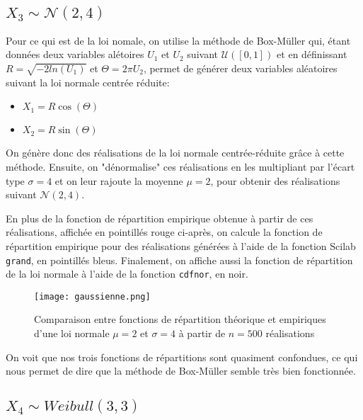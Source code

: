 \documentclass{article}
\begin{document}
\begin{multicols}{2}
\subsection{$X_3 \sim \mathcal{N}(2, 4)$}\label{subsec:ex23}

Pour ce qui est de la loi nomale, on utilise la méthode de Box-Müller qui, étant
données deux variables alétoires $U_1$ et $U_2$ suivant $\mathcal{U}([0, 1])$ et
en définissant $R = \sqrt{-2 ln(U_1)}$ et $\Theta = 2 \pi U_2$, permet de
générer deux variables aléatoires suivant la loi normale centrée réduite:

\begin{itemize}
    \item $X_1 = R\cos(\Theta)$
    \item $X_2 = R\sin(\Theta)$
\end{itemize}

On génère donc des réalisations de la loi normale centrée-réduite grâce à cette
méthode. Ensuite, on "dénormalise" ces réalisations en les multipliant par
l'écart type $\sigma = 4$ et on leur rajoute la moyenne $\mu = 2$, pour obtenir
des réalisations suivant $\mathcal{N}(2, 4)$.

En plus de la fonction de répartition empirique obtenue à partir de ces
réalisations, affichée en pointillés rouge ci-après, on calcule la fonction de
répartition empirique pour des réalisations générées à l'aide de la fonction
Scilab \texttt{grand}, en pointillés bleus. Finalement, on affiche aussi la
fonction de répartition de la loi normale à l'aide de la fonction
\texttt{cdfnor}, en noir.

\begin{figure}[H]
    \begin{center}
        \texttt{[image: gaussienne.png]}
        \centering
        \captionsetup{justification=centering}
        \caption{\label{fig:gaussienne}Comparaison entre fonctions de répartition théorique et empiriques d'une loi normale $\mu = 2$ et $\sigma = 4$ à partir de $n = 500$ réalisations}
    \end{center}
\end{figure}

On voit que nos trois fonctions de répartitions sont quasiment confondues, ce
qui nous permet de dire que la méthode de Box-Müller semble très bien
fonctionnée.

\subsection{$X_4 \sim Weibull(3, 3)$}\label{subsec:ex24}


\end{multicols}
\end{document}
